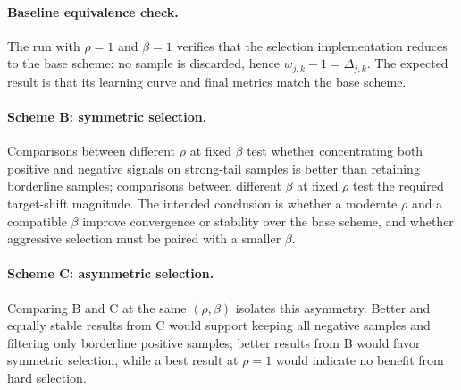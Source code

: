 \documentclass{article} %
\begin{document}
\paragraph{Baseline equivalence check.}
The run with $\rho=1$ and $\beta=1$ verifies that the selection
implementation reduces to the base scheme: no sample is discarded, hence
$w_{j,k}-1=\Delta_{j,k}$.  The expected result is that its learning curve and final metrics match the base scheme.

\paragraph{Scheme B: symmetric selection.}
 Comparisons between different $\rho$ at fixed $\beta$ test whether
concentrating both positive and negative signals on strong-tail samples is
better than retaining borderline samples; comparisons between different $\beta$ at fixed $\rho$ test
the required target-shift magnitude.  The intended conclusion is whether a
moderate $\rho$ and a compatible $\beta$ improve convergence or
stability over the base scheme, and whether aggressive selection must be
paired with a smaller $\beta$.

\paragraph{Scheme C: asymmetric selection.}
Comparing B and C at the same $(\rho,\beta)$ isolates this asymmetry.  Better and equally stable results from C would support keeping all negative samples and filtering only borderline positive samples; better results from B would favor symmetric selection, while a best result at $\rho=1$ would indicate no benefit from hard selection.
\end{document}
